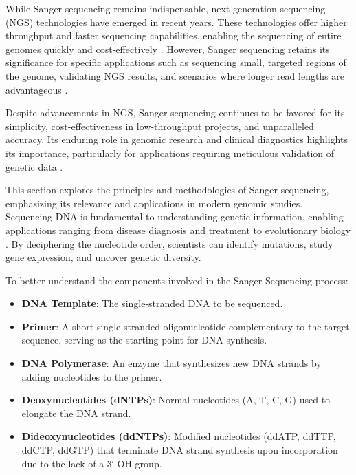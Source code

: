 While Sanger sequencing remains indispensable, next-generation sequencing (NGS) technologies have emerged in recent years. These technologies offer higher throughput and faster sequencing capabilities, enabling the sequencing of entire genomes quickly and cost-effectively \cite{metzker2010sequencing}. However, Sanger sequencing retains its significance for specific applications such as sequencing small, targeted regions of the genome, validating NGS results, and scenarios where longer read lengths are advantageous \cite{mardis2017dna}.

Despite advancements in NGS, Sanger sequencing continues to be favored for its simplicity, cost-effectiveness in low-throughput projects, and unparalleled accuracy. Its enduring role in genomic research and clinical diagnostics highlights its importance, particularly for applications requiring meticulous validation of genetic data \cite{shendure2017dna}.

This section explores the principles and methodologies of Sanger sequencing, emphasizing its relevance and applications in modern genomic studies.
Sequencing DNA is fundamental to understanding genetic information, enabling applications ranging from disease diagnosis and treatment to evolutionary biology \cite{turn0search0}. By deciphering the nucleotide order, scientists can identify mutations, study gene expression, and uncover genetic diversity.

To better understand the components involved in the Sanger Sequencing process:
\begin{itemize}
    \item \textbf{DNA Template}: The single-stranded DNA to be sequenced.
    \item \textbf{Primer}: A short single-stranded oligonucleotide complementary to the target sequence, serving as the starting point for DNA synthesis.
    \item \textbf{DNA Polymerase}: An enzyme that synthesizes new DNA strands by adding nucleotides to the primer.
    \item \textbf{Deoxynucleotides (dNTPs)}: Normal nucleotides (A, T, C, G) used to elongate the DNA strand.
    \item \textbf{Dideoxynucleotides (ddNTPs)}: Modified nucleotides (ddATP, ddTTP, ddCTP, ddGTP) that terminate DNA strand synthesis upon incorporation due to the lack of a 3′-OH group.
\end{itemize}

